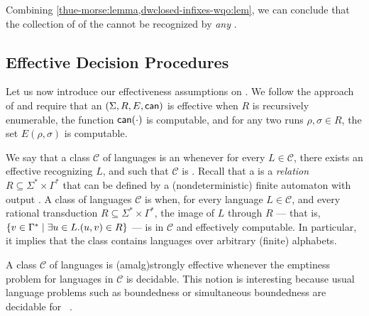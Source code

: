 \AP Combining
\cref{thue-morse:lemma,dwclosed-infixes-wqo:lem}, we can
conclude that the collection of  of the 
cannot be recognized by \emph{any} . 


\subsection{Effective Decision Procedures}
\label{infixes-amalgamation-effective:subsec}

\AP Let us now introduce our effectiveness assumptions on . We follow the approach of \cite{ASZZ24} and require that an
 $(\Sigma, R, E, \canrun)$ is effective when $R$ is
recursively enumerable, the function $\canrun(\cdot)$ is computable, and for
any two runs $\rho, \sigma \in R$, the set $E(\rho,\sigma)$ is computable.

\AP We say that a class $\mathcal{C}$ of languages is an  whenever for every $L \in \mathcal{C}$, there exists an
effective  recognizing $L$, and such that $\mathcal{C}$
is . Recall that a
 is a \emph{relation} $R \subseteq \Sigma^* \times
\Gamma^*$ that can be defined by a (nondeterministic) finite automaton with
output \cite[Chapter 5, page 64]{BERST79}. A class of languages $\mathcal{C}$
is  when, for every
language $L \in \mathcal{C}$, and every rational transduction $R \subseteq
\Sigma^* \times \Gamma^*$, the image of $L$ through $R$ --- that is, $\{ v
\in \Gamma^* \mid \exists u \in L. (u,v) \in R \}$ --- is in $\mathcal{C}$ and
effectively computable. In particular, it implies that the class contains
languages over arbitrary (finite) alphabets.

\AP A class $\mathcal{C}$ of languages is \intro(amalg){strongly effective}
whenever the emptiness problem for languages in $\mathcal{C}$ is decidable.
This notion is interesting because usual language problems such as boundedness
or simultaneous boundedness are decidable for ~\cite{ASZZ24}. 

